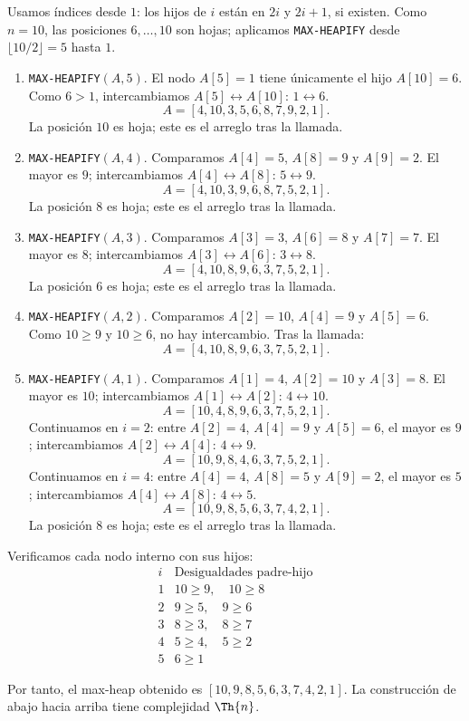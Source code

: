 
Usamos índices desde $1$: los hijos de $i$ están en $2i$ y $2i+1$, si existen. Como $n=10$, las posiciones $6,\dots,10$ son hojas; aplicamos \texttt{MAX-HEAPIFY} desde $\lfloor 10/2\rfloor=5$ hasta $1$.

\begin{enumerate}
\item \texttt{MAX-HEAPIFY}$(A,5)$. El nodo $A[5]=1$ tiene únicamente el hijo $A[10]=6$. Como $6>1$, intercambiamos $A[5]\leftrightarrow A[10]$: $1\leftrightarrow6$.
\[
A=[4,10,3,5,6,8,7,9,2,1].
\]
La posición $10$ es hoja; este es el arreglo tras la llamada.

\item \texttt{MAX-HEAPIFY}$(A,4)$. Comparamos $A[4]=5$, $A[8]=9$ y $A[9]=2$. El mayor es $9$; intercambiamos $A[4]\leftrightarrow A[8]$: $5\leftrightarrow9$.
\[
A=[4,10,3,9,6,8,7,5,2,1].
\]
La posición $8$ es hoja; este es el arreglo tras la llamada.

\item \texttt{MAX-HEAPIFY}$(A,3)$. Comparamos $A[3]=3$, $A[6]=8$ y $A[7]=7$. El mayor es $8$; intercambiamos $A[3]\leftrightarrow A[6]$: $3\leftrightarrow8$.
\[
A=[4,10,8,9,6,3,7,5,2,1].
\]
La posición $6$ es hoja; este es el arreglo tras la llamada.

\item \texttt{MAX-HEAPIFY}$(A,2)$. Comparamos $A[2]=10$, $A[4]=9$ y $A[5]=6$. Como $10\ge9$ y $10\ge6$, no hay intercambio. Tras la llamada:
\[
A=[4,10,8,9,6,3,7,5,2,1].
\]

\item \texttt{MAX-HEAPIFY}$(A,1)$. Comparamos $A[1]=4$, $A[2]=10$ y $A[3]=8$. El mayor es $10$; intercambiamos $A[1]\leftrightarrow A[2]$: $4\leftrightarrow10$.
\[
A=[10,4,8,9,6,3,7,5,2,1].
\]
Continuamos en $i=2$: entre $A[2]=4$, $A[4]=9$ y $A[5]=6$, el mayor es $9$; intercambiamos $A[2]\leftrightarrow A[4]$: $4\leftrightarrow9$.
\[
A=[10,9,8,4,6,3,7,5,2,1].
\]
Continuamos en $i=4$: entre $A[4]=4$, $A[8]=5$ y $A[9]=2$, el mayor es $5$; intercambiamos $A[4]\leftrightarrow A[8]$: $4\leftrightarrow5$.
\[
A=[10,9,8,5,6,3,7,4,2,1].
\]
La posición $8$ es hoja; este es el arreglo tras la llamada.
\end{enumerate}

Verificamos cada nodo interno con sus hijos:
\[
\begin{array}{c|l}
i & \text{Desigualdades padre-hijo}\\ \hline
1 & 10\ge9,\quad 10\ge8\\
2 & 9\ge5,\quad 9\ge6\\
3 & 8\ge3,\quad 8\ge7\\
4 & 5\ge4,\quad 5\ge2\\
5 & 6\ge1
\end{array}
\]

Por tanto, el max-heap obtenido es $\boxed{[10,9,8,5,6,3,7,4,2,1]}$. La construcción de abajo hacia arriba tiene complejidad $\Th{n}$.
\fin
